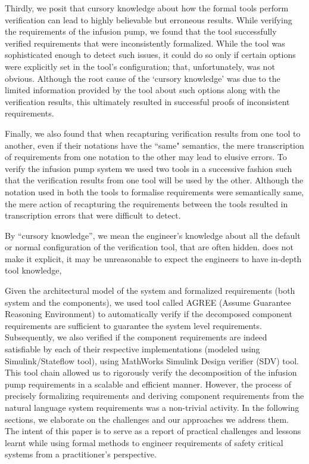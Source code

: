 Thirdly, we posit that cursory knowledge about how the formal tools perform  verification can lead to highly believable but erroneous results. While verifying the requirements of the infusion pump, we found that the tool successfully verified requirements that were inconsistently formalized. While the tool was sophisticated enough to detect such issues, it could do so only if certain options were explicitly set in the tool's configuration; that, unfortunately, was not obvious. Although the root cause of the `cursory knowledge' was due to the limited information provided by the tool about such options along with the verification results, this ultimately resulted in successful proofs of inconsistent requirements.

Finally, we also found that when recapturing verification results from one tool to another, even if their notations have the ``same" semantics, the mere transcription of requirements from one notation to the other may lead to elusive errors. To verify the infusion pump system we used two tools in a successive fashion such that the verification results from one tool will be used by the other. Although the notation used in both the tools to formalise requirements were semantically same, the mere action of recapturing the requirements between the tools resulted in transcription errors that were difficult to detect.

By ``cursory knowledge'', we mean the engineer's knowledge about all the default or normal configuration of the verification tool, that are often hidden. does not make it explicit, it may be unreasonable to expect the engineers to have in-depth tool knowledge,   %

Given the architectural model of the system and formalized requirements (both system and the components), we used tool called AGREE (Assume Guarantee Reasoning Environment) to automatically verify if the decomposed component requirements are sufficient to guarantee the system level requirements. Subsequently, we also verified if the component requirements are indeed satisfiable by each of their respective implementations (modeled using Simulink/Stateflow tool), using MathWorks Simulink Design verifier (SDV) tool. This tool chain allowed us to rigorously verify the decomposition of the infusion pump requirements in a scalable and efficient manner. However, the process of precisely formalizing requirements and deriving component requirements from the natural language system requirements was a non-trivial activity. In the following sections, we elaborate on the challenges  and our approaches we address them.
The intent of this paper is to serve as a report of practical challenges and lessons learnt while using formal methods to engineer requirements of safety critical systems from a practitioner's perspective.

